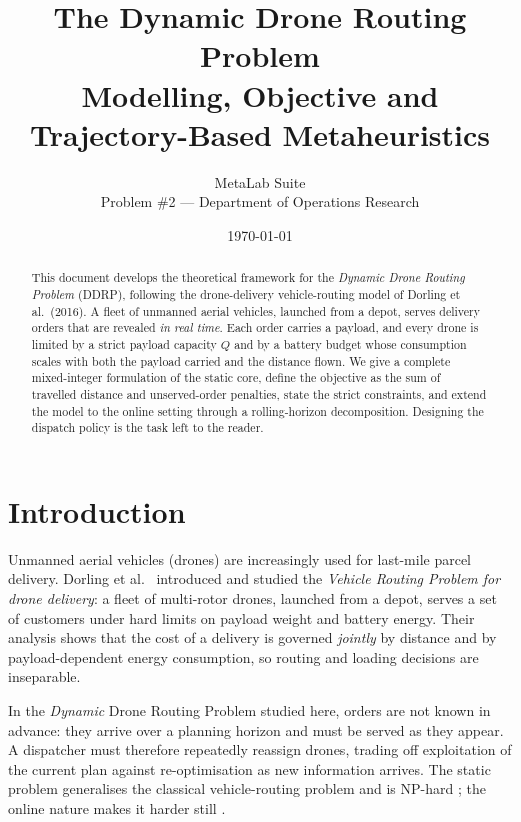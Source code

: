 \documentclass[11pt,a4paper]{article}
\title{%
  \textbf{The Dynamic Drone Routing Problem}\\[2mm]
  \large Modelling, Objective and Trajectory-Based Metaheuristics}
\author{%
  MetaLab Suite\\[1mm]
  \small Problem \#2 --- Department of Operations Research}
\date{\today}
\begin{document}
\maketitle

\begin{abstract}
\noindent
This document develops the theoretical framework for the \emph{Dynamic Drone
Routing Problem} (DDRP), following the drone-delivery vehicle-routing model of
Dorling et al.~(2016). A fleet of unmanned aerial vehicles, launched from a
depot, serves delivery orders that are revealed \emph{in real time}. Each order
carries a payload, and every drone is limited by a strict payload capacity $Q$
and by a battery budget whose consumption scales with both the payload carried
and the distance flown. We give a complete mixed-integer formulation of the
static core, define the objective as the sum of travelled distance and
unserved-order penalties, state the strict constraints, and extend the model to
the online setting through a rolling-horizon decomposition. Designing the
dispatch policy is the task left to the reader.
\end{abstract}

\tableofcontents

\section{Introduction}

Unmanned aerial vehicles (drones) are increasingly used for last-mile parcel
delivery. Dorling et al.~\cite{dorling2016} introduced and studied the
\emph{Vehicle Routing Problem for drone delivery}: a fleet of multi-rotor
drones, launched from a depot, serves a set of customers under hard limits on
payload weight and battery energy. Their analysis shows that the cost of a
delivery is governed \emph{jointly} by distance and by payload-dependent energy
consumption, so routing and loading decisions are inseparable.

In the \emph{Dynamic} Drone Routing Problem studied here, orders are not known
in advance: they arrive over a planning horizon and must be served as they
appear. A dispatcher must therefore repeatedly reassign drones, trading off
exploitation of the current plan against re-optimisation as new information
arrives. The static problem generalises the classical vehicle-routing problem
and is NP-hard \cite{toth2014}; the online nature makes it harder still
\cite{psaraftis1995}.
\end{document}
